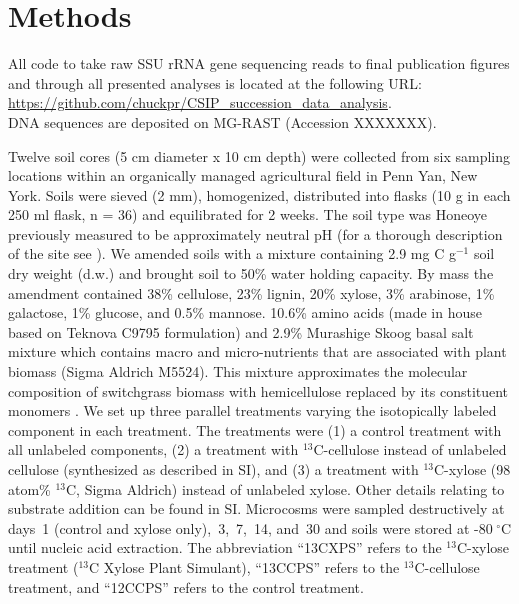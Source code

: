 \section{Methods}
%
All code to take raw SSU rRNA gene sequencing reads to final publication
figures and through all presented analyses is located at the following URL:\\
\url{https://github.com/chuckpr/CSIP_succession_data_analysis}.\\ DNA sequences
are deposited on MG-RAST (Accession XXXXXXX).

Twelve soil cores (5 cm diameter x 10 cm depth) were collected from six 
sampling locations within an organically managed agricultural field in Penn
Yan, New York. Soils were sieved (2 mm), homogenized, distributed into flasks
(10 g in each 250 ml flask, n = 36) and equilibrated for 2 weeks. The soil type
was Honeoye previously measured to be approximately neutral pH (for a thorough
description of the site see \citet{Berthrong_2013}). We amended
soils with a mixture containing 2.9 mg C g$^{-1}$ soil dry weight (d.w.) and
brought soil to 50\% water holding capacity. By mass the amendment
contained 38\% cellulose, 23\% lignin, 20\% xylose, 3\% arabinose, 1\%
galactose, 1\% glucose, and 0.5\% mannose. 10.6\% amino acids (made in house
based on Teknova C9795 formulation) and 2.9\% Murashige Skoog basal salt
mixture which contains macro and micro-nutrients that are associated with plant
biomass (Sigma Aldrich M5524). This mixture approximates the molecular
composition of switchgrass biomass with hemicellulose replaced by its
constituent monomers \citep{Schneckenberger_2008}. We set up three parallel
treatments varying the isotopically labeled component in each treatment. The
treatments were (1) a control treatment with all unlabeled components, (2) a
treatment with $^{13}$C-cellulose instead of unlabeled cellulose (synthesized
as described in SI), and (3) a treatment with $^{13}$C-xylose (98 atom\%
$^{13}$C, Sigma Aldrich) instead of unlabeled xylose. Other details relating to
substrate addition can be found in SI. Microcosms were sampled destructively at
days~1 (control and xylose only),~3,~7,~14, and~30 and soils were stored at
-80 $^{\circ}$C until nucleic acid extraction. The abbreviation “13CXPS” refers
to the $^{13}$C-xylose treatment ($^{13}$C Xylose Plant Simulant), “13CCPS”
refers to the $^{13}$C-cellulose treatment, and “12CCPS” refers to the control
treatment.

